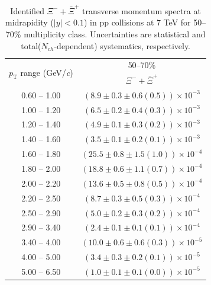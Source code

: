 \begin{table}
\caption{Identified $\Xi^{-} + \bar{\Xi}^{+}$ transverse momentum spectra at midrapidity ($|y|<0.1$) in pp collisions at 7 TeV for 50--70\% multiplicity class. Uncertainties are statistical and total($N_{ch}$-dependent) systematics, respectively.}
\label{tab:XiSum_50to70}
\begin{center}
\begin{tabular}{ c | c }
\hline
\multirow{2}{*}{$p_{\mathrm{T}}$ range (GeV/\textit{c})} & \multicolumn{1}{c}{50--70\%} \\ & $\Xi^{-} + \bar{\Xi}^{+}$\\ 
\hline
0.60 -- 1.00 & $(8.9\pm0.3\pm0.6(0.5))\times10^{-3}$ \\ 
1.00 -- 1.20 & $(6.5\pm0.2\pm0.4(0.3))\times10^{-3}$ \\ 
1.20 -- 1.40 & $(4.9\pm0.1\pm0.3(0.2))\times10^{-3}$ \\ 
1.40 -- 1.60 & $(3.5\pm0.1\pm0.2(0.1))\times10^{-3}$ \\ 
1.60 -- 1.80 & $(25.5\pm0.8\pm1.5(1.0))\times10^{-4}$ \\ 
1.80 -- 2.00 & $(18.8\pm0.6\pm1.1(0.7))\times10^{-4}$ \\ 
2.00 -- 2.20 & $(13.6\pm0.5\pm0.8(0.5))\times10^{-4}$ \\ 
2.20 -- 2.50 & $(8.7\pm0.3\pm0.5(0.3))\times10^{-4}$ \\ 
2.50 -- 2.90 & $(5.0\pm0.2\pm0.3(0.2))\times10^{-4}$ \\ 
2.90 -- 3.40 & $(2.4\pm0.1\pm0.1(0.1))\times10^{-4}$ \\ 
3.40 -- 4.00 & $(10.0\pm0.6\pm0.6(0.3))\times10^{-5}$ \\ 
4.00 -- 5.00 & $(3.4\pm0.3\pm0.2(0.1))\times10^{-5}$ \\ 
5.00 -- 6.50 & $(1.0\pm0.1\pm0.1(0.0))\times10^{-5}$ \\ 
\hline
\end{tabular}
\end{center}
\end{table}
 
